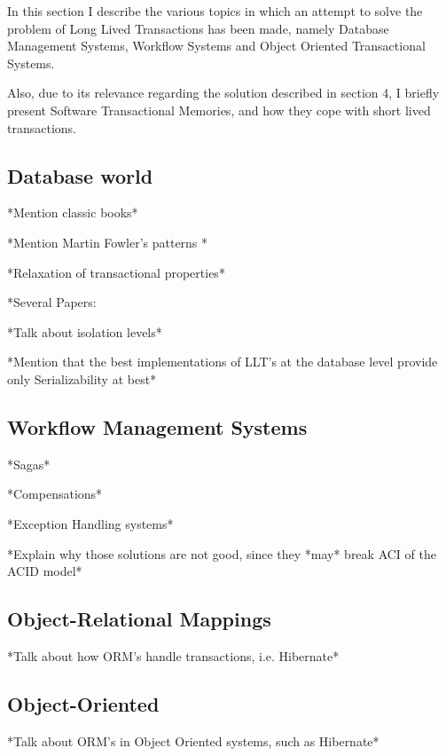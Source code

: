 \documentclass{llncs}
\begin{document}
In this section I describe the various topics in which an attempt to
solve the problem of Long Lived Transactions has been made, namely
Database Management Systems, Workflow Systems and Object Oriented
Transactional Systems.

Also, due to its relevance regarding the
solution described in section 4, I briefly present Software
Transactional Memories, and how they cope with short lived transactions.

\subsection{Database world}

*Mention classic books*

*Mention Martin Fowler's patterns \cite{fowler2003patterns}*

*Relaxation of transactional properties*

*Several Papers: \cite{hagmann1991implementing} \cite{garcia1987sagas}
\cite{salem1989altruistic}

*Talk about isolation levels*

*Mention that the best implementations of LLT's at the database level
provide only Serializability at best*

\subsection{Workflow Management Systems}

*Sagas* \cite{garcia1987sagas}

\cite{798492}

*Compensations*

*Exception Handling systems*

*Explain why those solutions are not good, since they *may* break ACI
of the ACID model*

\subsection{Object-Relational Mappings}

*Talk about how ORM's handle transactions, i.e. Hibernate*

\subsection{Object-Oriented}

*Talk about ORM's in Object Oriented systems, such as Hibernate*
\end{document}
